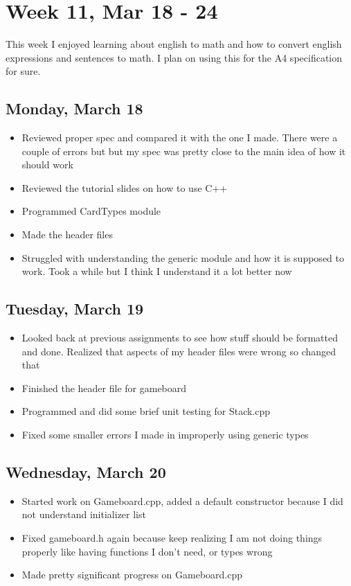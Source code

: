 \documentclass{article}
\begin{document}
\section{Week 11, Mar 18 - 24}

This week I enjoyed learning about english to math and how to convert english expressions and sentences to math. I plan on using this for the A4 specification for sure.

\subsection{Monday, March 18}
\begin{itemize}
    \item Reviewed proper spec and compared it with the one I made. There were a couple of errors but but my spec was pretty close to the main idea of how it should work
    \item Reviewed the tutorial slides on how to use C++
    \item Programmed CardTypes module
    \item Made the header files
    \item Struggled with understanding the generic module and how it is supposed to work. Took a while but I think I understand it a lot better now
\end{itemize}

\subsection{Tuesday, March 19}
\begin{itemize}
    \item Looked back at previous assignments to see how stuff should be formatted and done. Realized that aspects of my header files were wrong so changed that
    \item Finished the header file for gameboard
    \item Programmed and did some brief unit testing for Stack.cpp
    \item Fixed some smaller errors I made in improperly using generic types
\end{itemize}

\subsection{Wednesday, March 20}
\begin{itemize}
    \item Started work on Gameboard.cpp, added a default constructor because I did not understand initializer list
    \item Fixed gameboard.h again because keep realizing I am not doing things properly like having functions I don't need, or types wrong
    \item Made pretty significant progress on Gameboard.cpp
\end{itemize}
\end{document}
